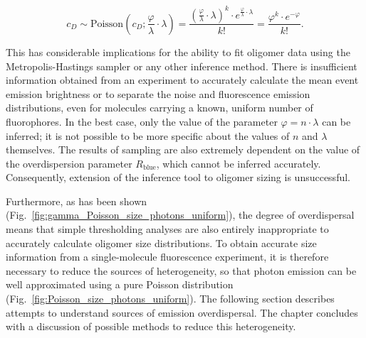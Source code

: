\begin{equation}
c_D \sim \text{Poisson}(c_D; \frac{\varphi}{\lambda} \cdot \lambda) = \frac{(\frac{\varphi}{\lambda} \cdot \lambda)^k \cdot e^{\frac{\varphi}{\lambda} \cdot \lambda}}{k!} = \frac{\varphi^{k} \cdot e^{-\varphi}}{k!}.
\label{eq:n_photons_2}
\end{equation}  

This has considerable implications for the ability to fit oligomer data using the Metropolis-Hastings sampler or any other inference method. There is insufficient information obtained from an experiment to accurately calculate the mean event emission brightness or to separate the noise and fluorescence emission distributions, even for molecules carrying a known, uniform number of fluorophores. In the best case, only the value of the parameter $\varphi = n \cdot \lambda$ can be inferred; it is not possible to be more specific about the values of $n$ and $\lambda$ themselves. The results of sampling are also extremely dependent on the value of the overdispersion parameter $R_{\text{blue}}$, which cannot be inferred accurately. Consequently, extension of the inference tool to oligomer sizing is unsuccessful. 

Furthermore, as has been shown (Fig.~\ref{fig:gamma_Poisson_size_photons_uniform}), the degree of overdispersal means that simple thresholding analyses are also entirely inappropriate to accurately calculate oligomer size distributions. To obtain accurate size information from a single-molecule fluorescence experiment, it is therefore necessary to reduce the sources of heterogeneity, so that photon emission can be well approximated using a pure Poisson distribution (Fig.~\ref{fig:Poisson_size_photons_uniform}). The following section describes attempts to understand sources of emission overdispersal. The chapter concludes with a discussion of possible methods to reduce this heterogeneity.   


